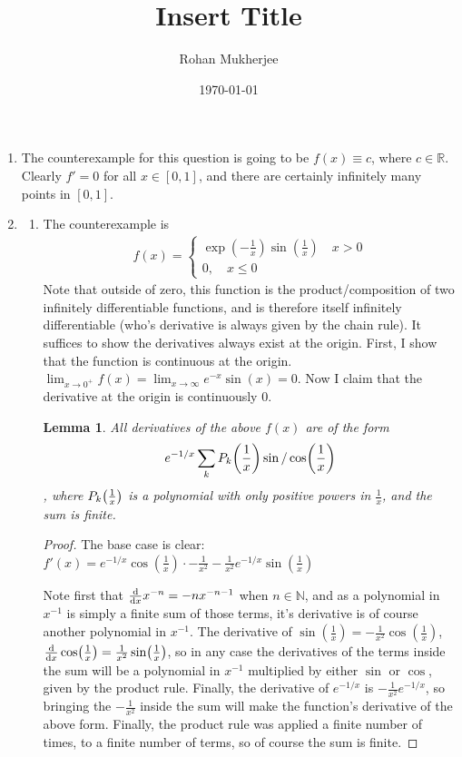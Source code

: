 \documentclass[12pt]{article}
\title{Insert Title}
\date{\today}
\author{Rohan Mukherjee}
\def\mbb#1{\mathbb{#1}}
\def\bN{\mbb{N}}
\newtheorem{lemma}[theorem]{Lemma}
\theoremstyle{definition}
\theoremstyle{remark}
\newcommand{\R}{\mathbb{R}}
\begin{document}
	\maketitle
	\begin{enumerate}[leftmargin=\labelsep]
		\item The counterexample for this question is going to be $f(x) \equiv c$, where $c \in \R$. Clearly $f' = 0$ for all $x \in [0, 1]$, and there are certainly infinitely many points in $[0, 1]$.
		
		\item 
		\begin{enumerate}
			\item The counterexample is 
			\begin{align*}
				f(x)=
				\begin{cases}
					\exp(-\frac 1x)\sin(\frac 1x) \quad x > 0 \\
					0, \quad x \leq 0
				\end{cases}
			\end{align*}
			Note that outside of zero, this function is the product/composition of two infinitely differentiable functions, and is therefore itself infinitely differentiable (who's derivative is always given by the chain rule). It suffices to show the derivatives always exist at the origin. First, I show that the function is continuous at the origin. $\lim_{x \to 0^+} f(x) = \lim_{x \to \infty} e^{-x}\sin(x) = 0$. Now I claim that the derivative at the origin is continuously 0.
		
			\begin{lemma}
				All derivatives of the above $f(x)$ are of the form \begin{align}
					e^{-1/x} \sum_k P_k\qty(\frac1x)\sin / \cos (\frac 1x)
				\end{align}, where $P_k\qty(\frac 1x)$ is a polynomial with only positive powers in $\frac 1x$, and the sum is finite.
			\end{lemma}
		
			\begin{proof}
				The base case is clear: $f'(x) = e^{-1/x}\cos(\frac 1x) \cdot -\frac 1{x^2} -\frac 1{x^2} e^{-1/x}\sin(\frac 1x)$
				
				Note first that $\dv{x} x^{-n} = -nx^{-n-1}$ when $n \in \bN$, and as a polynomial in $x^{-1}$ is simply a finite sum of those terms, it's derivative is of course another polynomial in $x^{-1}$. The derivative of $\sin(\frac 1x) = -\frac1{x^2}\cos(\frac 1x)$, $\dv{x} \cos(\frac1x) = \frac1{x^2}\sin(\frac1x)$, so in any case the derivatives of the terms inside the sum will be a polynomial in $x^{-1}$ multiplied by either $\sin$ or $\cos$, given by the product rule. Finally, the derivative of $e^{-1/x}$ is $-\frac1{x^2}e^{-1/x}$, so bringing the $-\frac1{x^2}$ inside the sum will make the function's derivative of the above form. Finally, the product rule was applied a finite number of times, to a finite number of terms, so of course the sum is finite.
			\end{proof}
		

\end{enumerate}
\end{enumerate}
\end{document}
